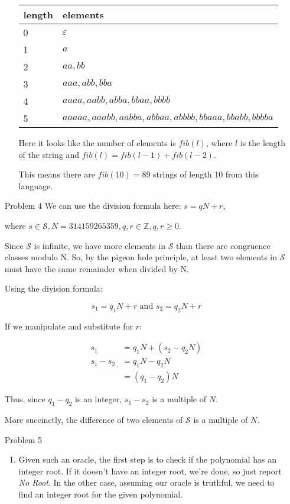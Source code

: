 \documentclass[12pt,letterpaper]{article}
\begin{document}
\begin{enumerate}
\begin{enumerate}
          \begin{tabular}{l | l}
            \multicolumn{1}{l}{length} & \multicolumn{1}{l}{elements} \\
            \hline
            0 & $\varepsilon$\\
            1 & $a$ \\
            2 & $aa, bb$ \\
            3 & $aaa, abb, bba$ \\
            4 & $aaaa, aabb, abba, bbaa, bbbb$ \\
            5 & $aaaaa, aaabb, aabba, abbaa, abbbb, bbaaa, bbabb, bbbba$
          \end{tabular}

          Here it looks like the number of elements is $fib(l)$,
          where $l$ is the length of the string and $fib(l) = fib(l-1) + fib(l-2)$.

          This means there are $fib(10) = 89$ strings of length 10 from this language.

      \end{enumerate}

    \item[Problem 4]
      We can use the division formula here: $s = qN + r$,

      where $s \in \mathcal{S}, N = 314159265359, q, r \in \mathbb{Z}, q, r \ge 0$.

      Since $\mathcal{S}$ is infinite, we have more elements in $\mathcal{S}$ than there are congruence classes modulo N.
      So, by the pigeon hole principle, at least two elements in $\mathcal{S}$ must have the same remainder when divided by N.

      Using the division formula:

      \[s_1 = q_1N + r \text{ and } s_2 = q_2N + r\]

      If we manipulate and substitute for $r$:

      \begin{align*}
        s_1 &= q_1N + (s_2 - q_2N) \\
        s_1 - s_2 &= q_1N - q_2N \\
        &= (q_1 - q_2)N
      \end{align*}

      Thus, since $q_1 - q_2$ is an integer, $s_1 - s_2$ is a multiple of $N$.

      More succinctly, the difference of two elements of $\mathcal{S}$ is a multiple of $N$.

    \item[Problem 5]
      \begin{enumerate}
        \item
          Given such an oracle, the first step is to check if the polynomial has an integer root.
          If it doesn't have an integer root, we're done, so just report \textit{No Root}.
          In the other case, assuming our oracle is truthful, we need to find an integer root for the given polynomial.


\end{enumerate}
\end{enumerate}
\end{document}
